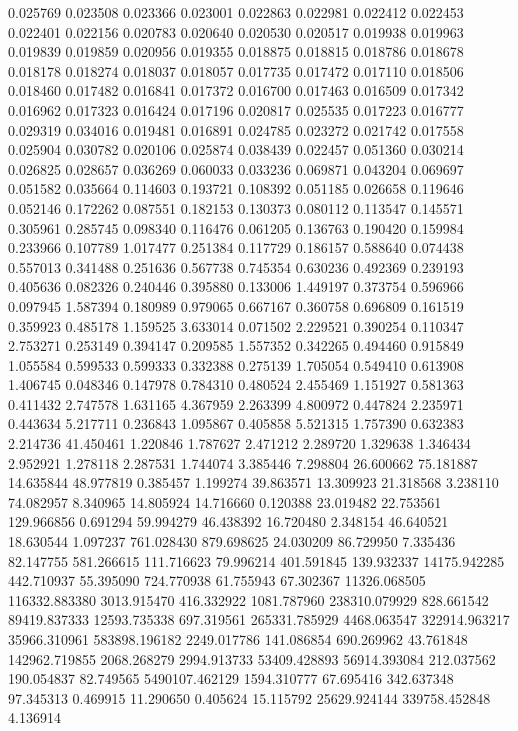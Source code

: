 0.025769
0.023508
0.023366
0.023001
0.022863
0.022981
0.022412
0.022453
0.022401
0.022156
0.020783
0.020640
0.020530
0.020517
0.019938
0.019963
0.019839
0.019859
0.020956
0.019355
0.018875
0.018815
0.018786
0.018678
0.018178
0.018274
0.018037
0.018057
0.017735
0.017472
0.017110
0.018506
0.018460
0.017482
0.016841
0.017372
0.016700
0.017463
0.016509
0.017342
0.016962
0.017323
0.016424
0.017196
0.020817
0.025535
0.017223
0.016777
0.029319
0.034016
0.019481
0.016891
0.024785
0.023272
0.021742
0.017558
0.025904
0.030782
0.020106
0.025874
0.038439
0.022457
0.051360
0.030214
0.026825
0.028657
0.036269
0.060033
0.033236
0.069871
0.043204
0.069697
0.051582
0.035664
0.114603
0.193721
0.108392
0.051185
0.026658
0.119646
0.052146
0.172262
0.087551
0.182153
0.130373
0.080112
0.113547
0.145571
0.305961
0.285745
0.098340
0.116476
0.061205
0.136763
0.190420
0.159984
0.233966
0.107789
1.017477
0.251384
0.117729
0.186157
0.588640
0.074438
0.557013
0.341488
0.251636
0.567738
0.745354
0.630236
0.492369
0.239193
0.405636
0.082326
0.240446
0.395880
0.133006
1.449197
0.373754
0.596966
0.097945
1.587394
0.180989
0.979065
0.667167
0.360758
0.696809
0.161519
0.359923
0.485178
1.159525
3.633014
0.071502
2.229521
0.390254
0.110347
2.753271
0.253149
0.394147
0.209585
1.557352
0.342265
0.494460
0.915849
1.055584
0.599533
0.599333
0.332388
0.275139
1.705054
0.549410
0.613908
1.406745
0.048346
0.147978
0.784310
0.480524
2.455469
1.151927
0.581363
0.411432
2.747578
1.631165
4.367959
2.263399
4.800972
0.447824
2.235971
0.443634
5.217711
0.236843
1.095867
0.405858
5.521315
1.757390
0.632383
2.214736
41.450461
1.220846
1.787627
2.471212
2.289720
1.329638
1.346434
2.952921
1.278118
2.287531
1.744074
3.385446
7.298804
26.600662
75.181887
14.635844
48.977819
0.385457
1.199274
39.863571
13.309923
21.318568
3.238110
74.082957
8.340965
14.805924
14.716660
0.120388
23.019482
22.753561
129.966856
0.691294
59.994279
46.438392
16.720480
2.348154
46.640521
18.630544
1.097237
761.028430
879.698625
24.030209
86.729950
7.335436
82.147755
581.266615
111.716623
79.996214
401.591845
139.932337
14175.942285
442.710937
55.395090
724.770938
61.755943
67.302367
11326.068505
116332.883380
3013.915470
416.332922
1081.787960
238310.079929
828.661542
89419.837333
12593.735338
697.319561
265331.785929
4468.063547
322914.963217
35966.310961
583898.196182
2249.017786
141.086854
690.269962
43.761848
142962.719855
2068.268279
2994.913733
53409.428893
56914.393084
212.037562
190.054837
82.749565
5490107.462129
1594.310777
67.695416
342.637348
97.345313
0.469915
11.290650
0.405624
15.115792
25629.924144
339758.452848
4.136914
